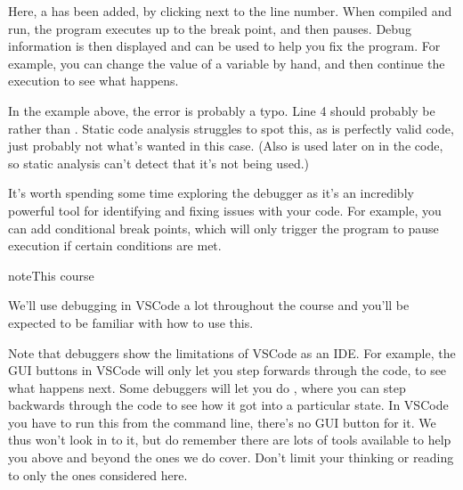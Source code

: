 \documentclass[letterpaper,10pt,british]{sphinxmanual}
\let\sphinxpxdimen\pdfpxdimen\else\newdimen\sphinxpxdimen
\begin{document}
\begin{figure}[htbp]
\centering

\noindent\sphinxincludegraphics[width=800\sphinxpxdimen]{{debugger}.png}
\end{figure}

\sphinxAtStartPar
Here, a  has been added, by clicking next to the line number. When compiled and run, the program executes up to the break point, and then pauses. Debug information is then displayed and can be used to help you fix the program. For example, you can change the value of a variable by hand, and then continue the execution to see what happens.

\sphinxAtStartPar
In the example above, the error is probably a typo. Line 4 should probably be  rather than . Static code analysis struggles to spot this, as  is perfectly valid code, just probably not what’s wanted in this case. (Also  is used later on in the code, so static analysis can’t detect that it’s not being used.)

\sphinxAtStartPar
It’s worth spending some time exploring the debugger as it’s an incredibly powerful tool for identifying and fixing issues with your code. For example, you can add conditional break points, which will only trigger the program to pause execution if certain conditions are met.

\begin{sphinxadmonition}{note}{This course}

\sphinxAtStartPar
We’ll use debugging in VSCode a lot throughout the course and you’ll be expected to be familiar with how to use this.

\sphinxAtStartPar
Note that debuggers show the limitations of VSCode as an IDE. For example, the GUI buttons in VSCode will only let you step forwards through the code, to see what happens next. Some debuggers will let you do , where you can step backwards through the code to see how it got into a particular state. In VSCode you have to run this from the command line, there’s no GUI button for it. We thus won’t look in to it, but do remember there are lots of tools available to help you above and beyond the ones we do cover. Don’t limit your thinking or reading to only the ones considered here.
\end{sphinxadmonition}
\end{document}
